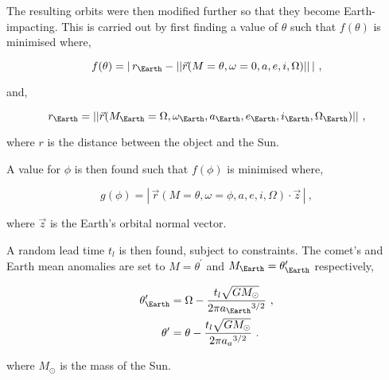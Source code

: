 The resulting orbits were then modified further so that they become Earth-impacting. This is carried out by first finding a value of $\theta$ such that $f(\theta)$ is minimised where,

\begin{equation}
    f(\theta) = | \, r_{\Earth} - ||\vec{r}(M = \theta, \omega = 0, a, e, i, \Omega)|| \, | ~,
\end{equation}

and,

\begin{equation}
   r_{\Earth} = ||\vec{r}(M_{\Earth}=\Omega, \omega_{\Earth}, a_{\Earth}, e_{\Earth}, i_{\Earth}, \Omega_{\Earth})||~,
\end{equation}

where $r$ is the distance between the object and the Sun.

A value for $\phi$ is then found such that $f(\phi)$ is minimised where,

\begin{equation}
    g(\phi) = | \, \vec{r}(M = \theta, \omega = \phi, a, e, i, \Omega) \cdot \vec{z} \, | ~,
\end{equation}

where $\vec{z}$ is the Earth's orbital normal vector.

A random lead time $t_l$ is then found, subject to constraints. The comet's and Earth mean anomalies are set to $M = \theta^{\prime}$ and $M_{\Earth} = \theta^{\prime}_{\Earth}$ respectively,

\begin{equation}
    \begin{split}
        \theta^{\prime}_{\Earth} &= \Omega - \dfrac{t_l \sqrt{GM_\odot}}{2\pi {a_{\Earth}}^{3/2}}~, \\
        \theta^{\prime} &= \theta - \dfrac{t_l \sqrt{GM_\odot}}{2\pi {a_{a}}^{3/2}}~.
    \end{split}
\end{equation}

where $M_\odot$ is the mass of the Sun.

\fi